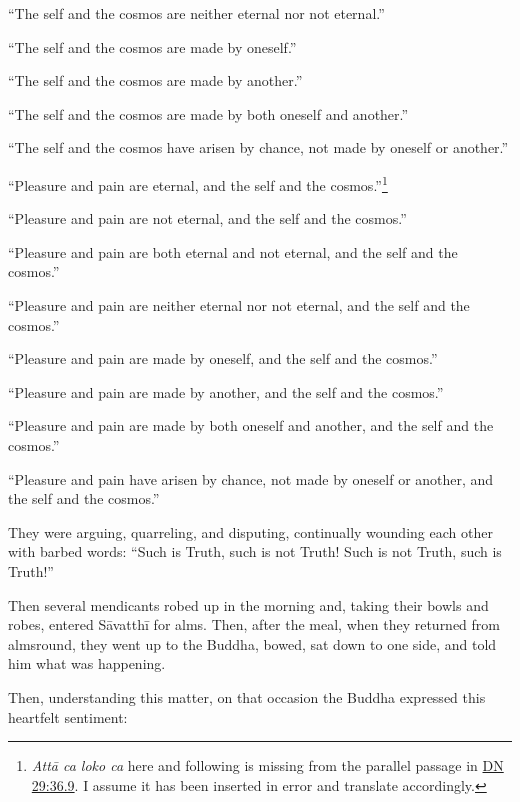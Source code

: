 \documentclass[12pt,openany]{book}%
\begin{document}
“The self and the cosmos are neither eternal nor not eternal.” 

“The self and the cosmos are made by oneself.” 

“The self and the cosmos are made by another.” 

“The self and the cosmos are made by both oneself and another.” 

“The self and the cosmos have arisen by chance, not made by oneself or another.” 

“Pleasure and pain are eternal, and the self and the cosmos.”\footnote{\textit{\textsanskrit{Attā} ca loko ca} here and following is missing from the parallel passage in \href{https://suttacentral.net/dn29/en/sujato\#36.9}{DN 29:36.9}. I assume it has been inserted in error and translate accordingly. } 

“Pleasure and pain are not eternal, and the self and the cosmos.” 

“Pleasure and pain are both eternal and not eternal, and the self and the cosmos.” 

“Pleasure and pain are neither eternal nor not eternal, and the self and the cosmos.” 

“Pleasure and pain are made by oneself, and the self and the cosmos.” 

“Pleasure and pain are made by another, and the self and the cosmos.” 

“Pleasure and pain are made by both oneself and another, and the self and the cosmos.” 

“Pleasure and pain have arisen by chance, not made by oneself or another, and the self and the cosmos.” 

They were arguing, quarreling, and disputing, continually wounding each other with barbed words: “Such is Truth, such is not Truth! Such is not Truth, such is Truth!” 

Then several mendicants robed up in the morning and, taking their bowls and robes, entered \textsanskrit{Sāvatthī} for alms. Then, after the meal, when they returned from almsround, they went up to the Buddha, bowed, sat down to one side, and told him what was happening. 

Then, understanding this matter, on that occasion the Buddha expressed this heartfelt sentiment: 
\end{document}

